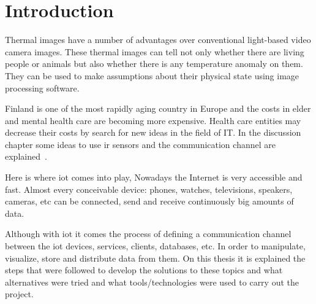 \documentclass[hidelinks,11pt,a4paper,oneside,article]{memoir}
\begin{document}
\setcounter{page}{1} %
\ClearWallPaper

\sloppy %

\chapter{Introduction}\label{sec:introduction}


Thermal images have a number of advantages over conventional light-based video camera images. These thermal images can tell not only whether there are living people or animals but also whether there is any temperature anomaly on them. They can be used to make assumptions about their physical state using image processing software.

Finland is one of the most rapidly aging country in Europe and the costs in elder and mental health care are becoming more expensive. Health care entities may decrease their costs by search for new ideas in the field of IT. In the discussion chapter some ideas to use \gls{ir} sensors and the communication channel are explained~\cite{agingeuropa}.

Here is where \gls{iot} comes into play, Nowadays the Internet is very accessible and fast. Almost every conceivable device: phones, watches, televisions, speakers, cameras, etc can be connected, send and receive continuously big amounts of data.

Although with \gls{iot} it comes the process of defining a communication channel between the \gls{iot} devices, services, clients, databases, etc. In order to manipulate, visualize, store and distribute data from them. On this thesis it is explained the steps that were followed to develop the solutions to these topics and what alternatives were tried and what tools/technologies were used to carry out the project.



\end{document}
